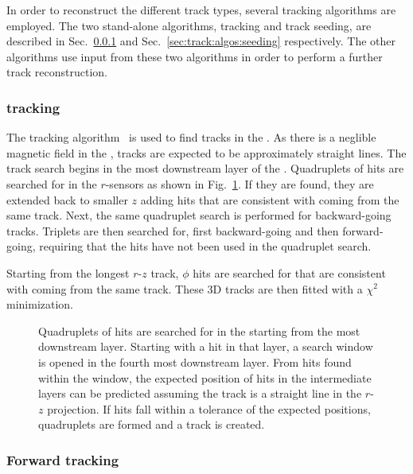 In order to reconstruct the different track types, several tracking algorithms are employed. The two stand-alone algorithms, \velo tracking and track seeding, are described in Sec.~\ref{sec:track:algos:velo} and Sec.~\ref{sec:track:algos:seeding} respectively. The other algorithms use input from these two algorithms in order to perform a further track reconstruction.

\subsubsection{\velo tracking}
\label{sec:track:algos:velo}

The \velo tracking algorithm~\cite{fastvelo} is used to find tracks in the \velo. As there is a neglible magnetic field in the \velo, tracks are expected to be approximately straight lines. The track search begins in the most downstream layer of the \velo. Quadruplets of hits are searched for in the $r$-sensors as shown in Fig.~\ref{fig:velo-tracking}. If they are found, they are extended back to smaller $z$ adding hits that are consistent with coming from the same track. Next, the same quadruplet search is performed for backward-going tracks. Triplets are then searched for, first backward-going and then forward-going, requiring that the hits have not been used in the quadruplet search.

Starting from the longest $r$-$z$ track, $\phi$ hits are searched for that are consistent with coming from the same track. These 3D tracks are then fitted with a $\chi^{2}$ minimization.

\begin{figure}[!tb]
  \centering
  
  \caption{Quadruplets of hits are searched for in the \velo starting from the most downstream layer. Starting with a hit in that layer, a search window is opened in the fourth most downstream layer. From hits found within the window, the expected position of hits in the intermediate layers can be predicted assuming the track is a straight line in the $r$-$z$ projection. If hits fall within a tolerance of the expected positions, quadruplets are formed and a track is created.}
  \label{fig:velo-tracking}
\end{figure}

\subsubsection{Forward tracking}
\label{sec:track:algos:forward}

